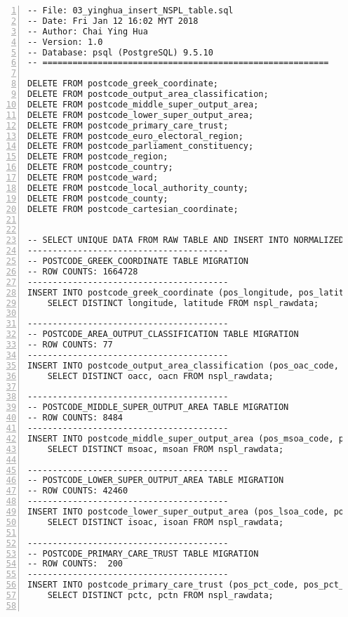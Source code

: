 \lstset{basicstyle=\ttfamily\tiny}  
\begin{lstlisting}[breaklines, frame=single, numbers=left, caption={PL/pgSQL's DML Script for Postcode Normalized Database Migration.}, label=commandline-02]
-- File: 03_yinghua_insert_NSPL_table.sql
-- Date: Fri Jan 12 16:02 MYT 2018
-- Author: Chai Ying Hua 
-- Version: 1.0 
-- Database: psql (PostgreSQL) 9.5.10
-- =========================================================

DELETE FROM postcode_greek_coordinate;
DELETE FROM postcode_output_area_classification; 
DELETE FROM postcode_middle_super_output_area; 
DELETE FROM postcode_lower_super_output_area;
DELETE FROM postcode_primary_care_trust;
DELETE FROM postcode_euro_electoral_region;
DELETE FROM postcode_parliament_constituency;
DELETE FROM postcode_region;
DELETE FROM postcode_country;
DELETE FROM postcode_ward;
DELETE FROM postcode_local_authority_county;
DELETE FROM postcode_county;
DELETE FROM postcode_cartesian_coordinate;


-- SELECT UNIQUE DATA FROM RAW TABLE AND INSERT INTO NORMALIZED DATA. 
----------------------------------------
-- POSTCODE_GREEK_COORDINATE TABLE MIGRATION 
-- ROW COUNTS: 1664728 
----------------------------------------
INSERT INTO postcode_greek_coordinate (pos_longitude, pos_latitude)
	SELECT DISTINCT longitude, latitude FROM nspl_rawdata;

----------------------------------------
-- POSTCODE_AREA_OUTPUT_CLASSIFICATION TABLE MIGRATION 
-- ROW COUNTS: 77 
----------------------------------------
INSERT INTO postcode_output_area_classification (pos_oac_code, pos_oac_name)
	SELECT DISTINCT oacc, oacn FROM nspl_rawdata;

----------------------------------------
-- POSTCODE_MIDDLE_SUPER_OUTPUT_AREA TABLE MIGRATION 
-- ROW COUNTS: 8484 
----------------------------------------
INSERT INTO postcode_middle_super_output_area (pos_msoa_code, pos_msoa_name)
	SELECT DISTINCT msoac, msoan FROM nspl_rawdata;

----------------------------------------
-- POSTCODE_LOWER_SUPER_OUTPUT_AREA TABLE MIGRATION 
-- ROW COUNTS: 42460 
----------------------------------------
INSERT INTO postcode_lower_super_output_area (pos_lsoa_code, pos_lsoa_name)
	SELECT DISTINCT isoac, isoan FROM nspl_rawdata;

----------------------------------------
-- POSTCODE_PRIMARY_CARE_TRUST TABLE MIGRATION 
-- ROW COUNTS:  200
----------------------------------------
INSERT INTO postcode_primary_care_trust (pos_pct_code, pos_pct_name)
	SELECT DISTINCT pctc, pctn FROM nspl_rawdata;


\end{lstlisting}
